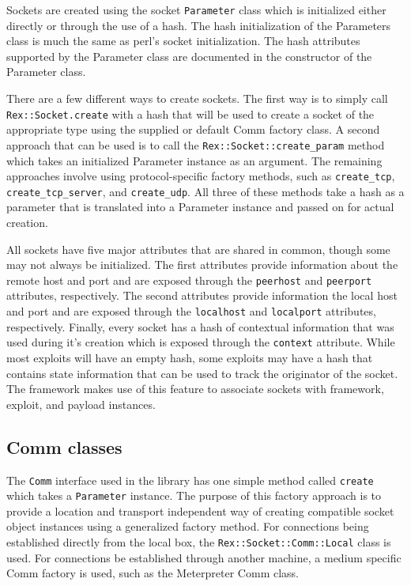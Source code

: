 \documentclass{report}
\begin{document}
\par
Sockets are created using the socket \texttt{Parameter} class which
is initialized either directly or through the use of a hash.  The
hash initialization of the Parameters class is much the same as
perl's socket initialization.  The hash attributes supported by the
Parameter class are documented in the constructor of the Parameter
class.

\par
There are a few different ways to create sockets.  The first way is
to simply call \texttt{Rex::Socket.create} with a hash that will be
used to create a socket of the appropriate type using the supplied
or default Comm factory class.  A second approach that can be used
is to call the \texttt{Rex::Socket::create\_param} method which
takes an initialized Parameter instance as an argument.  The
remaining approaches involve using protocol-specific factory
methods, such as \texttt{create\_tcp}, \texttt{create\_tcp\_server},
and \texttt{create\_udp}.  All three of these methods take a hash as
a parameter that is translated into a Parameter instance and passed
on for actual creation.

\par
All sockets have five major attributes that are shared in common,
though some may not always be initialized.  The first attributes
provide information about the remote host and port and are exposed
through the \texttt{peerhost} and \texttt{peerport} attributes,
respectively.  The second attributes provide information the local
host and port and are exposed through the \texttt{localhost} and
\texttt{localport} attributes, respectively.  Finally, every socket
has a hash of contextual information that was used during it's
creation which is exposed through the \texttt{context} attribute.
While most exploits will have an empty hash, some exploits may have
a hash that contains state information that can be used to track the
originator of the socket.  The framework makes use of this feature
to associate sockets with framework, exploit, and payload instances.

        \subsection{Comm classes}

\par
The \texttt{Comm} interface used in the library has one simple
method called \texttt{create} which takes a \texttt{Parameter}
instance.  The purpose of this factory approach is to provide a
location and transport independent way of creating compatible socket
object instances using a generalized factory method.  For
connections being established directly from the local box, the
\texttt{Rex::Socket::Comm::Local} class is used.  For connections be
established through another machine, a medium specific Comm factory
is used, such as the Meterpreter Comm class.
\end{document}
